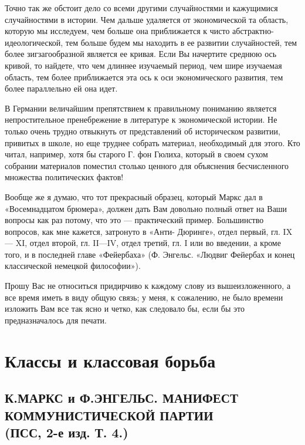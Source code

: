 \documentclass[12pt]{article}
\newcommand\resetparcount{%
  \setcounter{parcount}{0}
}
\newcommand{\parnum}{(\arabic{parcount})}
\newcounter{parcount}
\newenvironment{parnumbers}{%
  \par%
  \everypar{\noindent \stepcounter{parcount}\marginpar[]{\parnum}}%
}{}
\begin{document}
\begin{parnumbers}
    Точно так же обстоит дело со всеми другими случайностями и кажущимися случайностями в истории. Чем дальше удаляется от экономической та область, которую мы исследуем, чем больше она приближается к чисто абстрактно-идеологической, тем больше будем мы находить в ее развитии случайностей, тем более зигзагообразной является ее кривая. Если Вы начертите среднюю ось кривой, то найдете, что чем длиннее изучаемый период, чем шире изучаемая область, тем более приближается эта ось к оси экономического развития, тем более параллельно ей она идет.

    В Германии величайшим препятствием к правильному пониманию является непростительное пренебрежение в литературе к экономической истории. Не только очень трудно отвыкнуть от представлений об историческом развитии, привитых в школе, но еще труднее собрать материал, необходимый для этого. Кто читал, например, хотя бы старого Г. фон Гюлиха, который в своем сухом собрании материалов поместил столько ценного для объяснения бесчисленного множества политических фактов!

    Вообще же я думаю, что тот прекрасный образец, который Маркс дал в «Восемнадцатом брюмера», должен дать Вам довольно полный ответ на Ваши вопросы как раз потому, что это — практический пример. Большинство вопросов, как мне кажется, затронуто в «Анти- Дюринге», отдел первый, гл. IX— XI, отдел второй, гл. II—IV, отдел третий, гл. I или во введении, а кроме того, и в последней главе «Фейербаха» (Ф. Энгельс. «Людвиг Фейербах и конец классической немецкой философии»).

    Прошу Вас не относиться придирчиво к каждому слову из вышеизложенного, а все время иметь в виду общую связь; у меня, к сожалению, не было времени изложить Вам все так ясно и четко, как следовало бы, если бы это предназначалось для печати.
\end{parnumbers}




\section{Классы и классовая борьба}
\resetparcount
\subsection{К.МАРКС и Ф.ЭНГЕЛЬС.  МАНИФЕСТ КОММУНИСТИЧЕСКОЙ ПАРТИИ \\
  (ПСС, 2-е изд. Т. 4.)}
\end{document}
